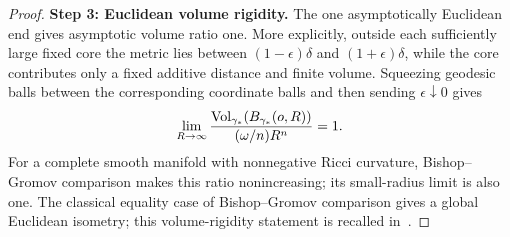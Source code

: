 \begin{proof}
\smallskip\noindent
\textbf{Step 3: Euclidean volume rigidity.}
The one asymptotically Euclidean end gives asymptotic volume ratio
one.  More explicitly, outside each sufficiently large fixed core
the metric lies between $(1-\epsilon)\delta$ and
$(1+\epsilon)\delta$, while the core contributes only a fixed
additive distance and finite volume.  Squeezing geodesic balls
between the corresponding coordinate balls and then sending
$\epsilon\downarrow0$ gives
\[
 \lim_{R\to\infty}
 \frac{\operatorname{Vol}_{\gamma_*}(B_{\gamma_*}(o,R))}{(\omega/n)R^n}=1.
\]
For a complete smooth manifold with nonnegative Ricci curvature,
Bishop--Gromov comparison makes this ratio nonincreasing; its
small-radius limit is also one.  The classical equality case of Bishop--Gromov comparison gives a
global Euclidean isometry; this volume-rigidity statement is recalled
in~\cite[p.~3237, before Theorem~1.1]{CavallettiManini}.
\end{proof}


